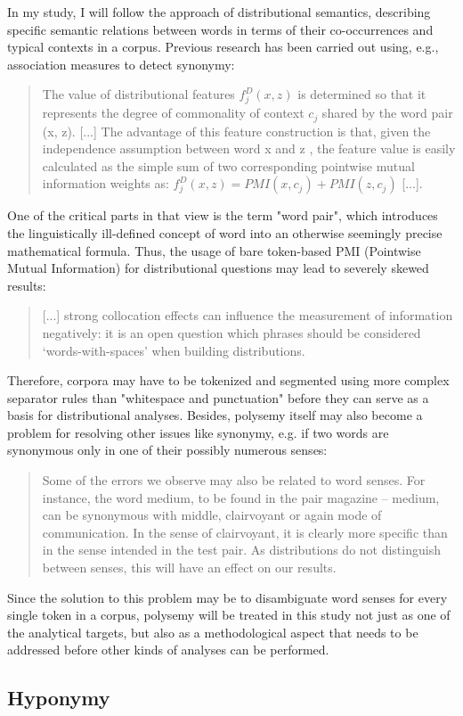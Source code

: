 \documentclass[jou]{apa6} %
\begin{document}
In my study, I will follow the approach of distributional semantics, describing specific semantic relations between words in terms of their co-occurrences and typical contexts in a corpus. Previous research has been carried out using, e.g., association measures to detect synonymy:
\blockquote[{\cite[p.~566]{hagiwaraSupervisedSynonymAcquisition2009}}]{The value of distributional features \( f_j^D (x, z) \) is determined so that it represents the degree of commonality of context \( c_j \) shared by the word pair (x, z). [...] The advantage of this feature construction is that, given the independence assumption between word x and z , the feature value is easily calculated as the simple sum of two corresponding pointwise mutual information weights as: \( f_j^D (x, z) = PMI(x, c_j) + PMI(z, c_j) \) [...].}
One of the critical parts in that view is the term "word pair", which introduces the linguistically ill-defined concept of word into an otherwise seemingly precise mathematical formula. Thus, the usage of bare token-based PMI (Pointwise Mutual Information) for distributional questions may lead to severely skewed results:
\blockquote[{\cite[p.~444]{herbelotMeasuringSemanticContent2013}}]{[...] strong collocation effects can influence the measurement of information negatively: it is an open question which phrases should be considered ‘words-with-spaces’ when building distributions.}
Therefore, corpora may have to be tokenized and segmented using more complex separator rules than "whitespace and punctuation" before they can serve as a basis for distributional analyses. Besides, polysemy itself may also become a problem for resolving other issues like synonymy, e.g. if two words are synonymous only in one of their possibly numerous senses:
\blockquote[{\cite[p.~444]{herbelotMeasuringSemanticContent2013}}]{Some of the errors we observe may also be related to word senses. For instance, the word medium, to be found in the pair magazine – medium, can be synonymous with middle, clairvoyant or again mode of communication. In the sense of clairvoyant, it is clearly more specific than in the sense intended in the test pair. As distributions do not distinguish between senses, this will have an effect on our results.}
Since the solution to this problem may be to disambiguate word senses for every single token in a corpus, polysemy will be treated in this study not just as one of the analytical targets, but also as a methodological aspect that needs to be addressed before other kinds of analyses can be performed. 

\subsection{Hyponymy}
\end{document}
